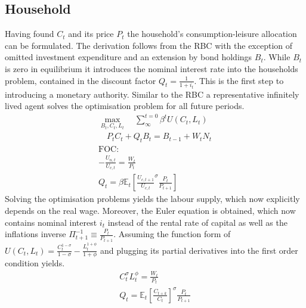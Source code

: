 \documentclass[12pt,a4paper,english]{article} %
\newcommand{\E}{\mathbb{E}} %
\begin{document}
	\subsection{Household}
	Having found $C_t$ and its price $P_t$ the household's consumption-leisure allocation can be formulated. The derivation follows from the RBC with the exception of omitted investment expenditure and an extension by bond holdings $B_t$. While $B_t$ is zero in equilibrium it introduces the nominal interest rate into the households problem, contained in the discount factor $Q_t = \frac{1}{1+i_t}$. This is the first step to introducing a monetary authority. Similar to the RBC a representative infinitely lived agent solves the optimisation problem for all future periods. 
	\begin{equation}
		\begin{aligned}
			\max_{B_t, C_t, L_t} \quad \sum_{\infty}^{t=0} \beta^{t} U(C_{t}, L_{t}) \\
			\quad P_t C_t + Q_t B_t = B_{t-1} + W_t N_t \\
			\textrm{FOC:} \\
				- \frac{U_{n,t}}{U_{c, t}} = \frac{W_t}{P_t}\\
				Q_t = \beta \E_t \left[ \frac{U_{c, t+1}}{U_{c,t}}^\sigma \frac{P_t}{P_{t+1}} \right] 			
		\end{aligned}
	\end{equation}
	Solving the optimisation problems yields the labour supply, which now explicitly depends on the real wage. Moreover, the Euler equation is obtained, which now contains nominal interest $i_t$ instead of the rental rate of capital as well as the inflations inverse $\Pi_{t+1}^{-1} \equiv \frac{P_t}{P_{t+1}}$. Assuming the function form of $U(C_t, L_t) = \frac{C_t^{1-\sigma}}{{1-\sigma}} - \frac{L_t^{1+\phi}}{1+\phi}$ and plugging its partial derivatives into the first order condition yields.
		\begin{equation} \label{eq:nk_hh_foc}
		\begin{aligned}
			C_t^\sigma L_t^\phi	= \frac{W_t}{P_t} \\
			Q_{t} = \E_t \left[ \frac{C_{t+k}}{C_t} \right]^\sigma \frac{P_t}{P_{t+1}}
		\end{aligned}
	\end{equation}
	
\end{document}
